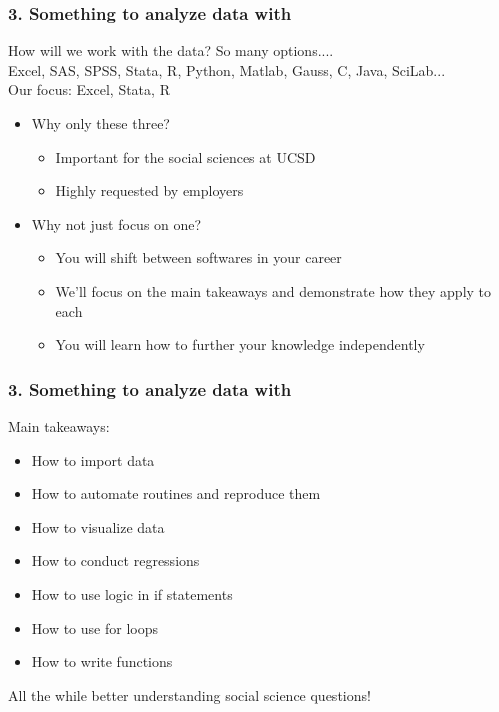 \documentclass[11pt]{beamer}
\begin{document}
\begin{frame}
\frametitle{3. Something to analyze data with}
How will we work with the data? So many options....\\
\bigskip
\uncover
{Excel, SAS, SPSS, Stata, R, Python, Matlab, Gauss, C, Java, SciLab...}\\
\bigskip
Our focus: \alert{Excel}, \alert{Stata}, \alert{R} \pause
\begin{itemize}
\item Why only these three?
\begin{itemize}
\item \alert{Important} for the social sciences at UCSD
\item Highly requested by \alert{employers}
\end{itemize} \pause
\item Why not just focus on one?
\begin{itemize}
\item You will \alert{shift} between softwares in your career
\item We'll focus on the \alert{main takeaways} and demonstrate how they apply to each
\item You will learn how to \alert{further} your knowledge independently
\end{itemize}
\end{itemize}
\end{frame}

\begin{frame}
\frametitle{3.  Something to analyze data with}
Main takeaways:
\begin{itemize}
\item How to \alert{import} data
\item How to \alert{automate} routines and \alert{reproduce} them
\item How to \alert{visualize} data 
\item How to conduct \alert{regressions}
\item How to use \alert{logic} in \alert{if statements}
\item How to use \alert{for loops}
\item How to write \alert{functions}
\end{itemize}
\uncover
{All the while better understanding \alert{social science questions}!}
\end{frame}
\end{document}
